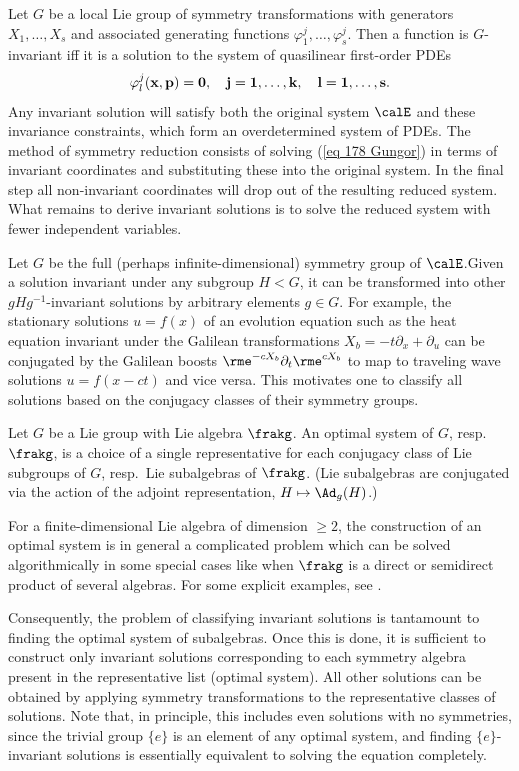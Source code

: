 Let $G$ be a local Lie group of symmetry transformations with generators $X_1,\ldots,X_s$ and associated generating functions $\varphi^j_1,\ldots,\varphi^j_s$. Then a function is $G$-invariant iff it is a solution to the system of quasilinear first-order PDEs
\[\varphi^j_l(\bf{x},\bf{p})=0,\quad j=1,\ldots,k,\quad l=1,\ldots,s.\label{eq 178 Gungor}\]
Any invariant solution will satisfy both the original system $\calE$ and these invariance constraints, which form an overdetermined system of PDEs. The method of symmetry reduction consists of solving (\ref{eq 178 Gungor}) in terms of invariant coordinates and substituting these into the original system. In the final step all non-invariant coordinates will drop out of the resulting reduced system. What remains to derive invariant solutions is to solve the reduced system with fewer independent variables.

Let $G$ be the full (perhaps infinite-dimensional) symmetry group of $\calE$.Given a solution invariant under any subgroup $H<G$, it can be transformed into other $gHg^{-1}$-invariant solutions by arbitrary elements $g\in G$. For example, the stationary solutions $u=f(x)$ of an evolution equation such as the heat equation invariant under the Galilean transformations $X_b=-t\partial_x+\partial_u$ can be conjugated by the Galilean boosts $\rme^{-c X_b}\partial_t\rme^{c X_b}$ to map to traveling wave solutions $u=f(x-ct)$ and vice versa. This motivates one to classify all solutions based on the conjugacy classes of their symmetry groups.

\begin{defn}
    Let $G$ be a Lie group with Lie algebra $\frakg$. An optimal system of $G$, resp.\ $\frakg$, is a choice of a single representative for each conjugacy class of Lie subgroups of $G$, resp.\ Lie subalgebras of $\frakg$. (Lie subalgebras are conjugated via the action of the adjoint representation, $H\mapsto \Ad_g(H)$.)
\end{defn}

For a finite-dimensional Lie algebra of dimension $\geq 2$, the construction of an optimal system is in general a complicated problem which can be solved algorithmically in some special cases like when $\frakg$ is a direct or semidirect product of several algebras. For some explicit examples, see \cite{Gungor}.

Consequently, the problem of classifying invariant solutions is tantamount to finding the optimal system of subalgebras. Once this is done, it is sufficient to construct only invariant solutions corresponding to each symmetry algebra present in the representative list (optimal system). All other solutions can be obtained by applying symmetry transformations to the representative classes of solutions. Note that, in principle, this includes even solutions with no symmetries, since the trivial group $\{e\}$ is an element of any optimal system, and finding $\{e\}$-invariant solutions is essentially equivalent to solving the equation completely.






